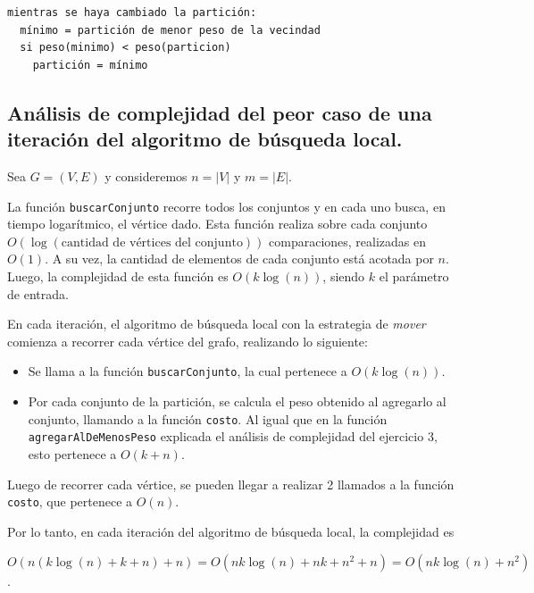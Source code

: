 \begin{verbatim}
mientras se haya cambiado la partición:
  mínimo = partición de menor peso de la vecindad
  si peso(minimo) < peso(particion)
    partición = mínimo
\end{verbatim}



\newpage
\subsection{Análisis de complejidad del peor caso de una iteración del
            algoritmo de búsqueda local.}
\vspace*{0.3cm}

Sea $G = (V,E)$ y consideremos $n = |V|$ y $m = |E|$.

La función \texttt{buscarConjunto} recorre todos los conjuntos y en cada uno
busca, en tiempo logarítmico, el vértice dado. Esta función realiza sobre cada
conjunto $O(\log(\text{cantidad de vértices del conjunto}))$ comparaciones,
realizadas en $O(1)$. A su vez, la cantidad de elementos de cada conjunto está
acotada por $n$. Luego, la complejidad de esta función es $O(k\log(n))$, siendo
$k$ el parámetro de entrada.

\vspace*{0.3cm}

En cada iteración, el algoritmo de búsqueda local con la estrategia de
\textit{mover} comienza a recorrer cada vértice del grafo, realizando lo siguiente:
\begin{itemize}
  \item Se llama a la función \texttt{buscarConjunto}, la cual pertenece a
  $O(k\log(n))$.

  \item Por cada conjunto de la partición, se calcula el peso obtenido al
  agregarlo al conjunto, llamando a la función \texttt{costo}. Al igual que en
  la función \texttt{agregarAlDeMenosPeso} explicada el análisis de complejidad del ejercicio 3, esto pertenece a $O(k + n)$.
\end{itemize}

Luego de recorrer cada vértice, se pueden llegar a realizar 2 llamados a
la función \texttt{costo}, que pertenece a $O(n)$.

Por lo tanto, en cada iteración del algoritmo de búsqueda local, la complejidad
es
\begin{center}
  $O(n (k\log(n) + k + n) + n) = O(nk\log(n) + nk + n^2 + n) = O(nk\log(n) +
n^2)$.
\end{center}

